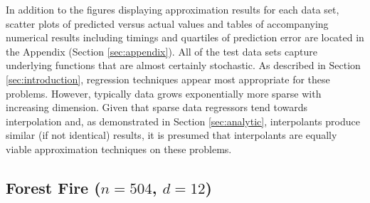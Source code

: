 In addition to the figures displaying approximation results for each
data set, scatter plots of predicted versus actual values
  and tables of accompanying numerical results including
  timings and quartiles of prediction error are located in the
Appendix (Section \ref{sec:appendix}). All of the test data sets
capture underlying functions that are almost certainly stochastic. As
described in Section \ref{sec:introduction}, regression techniques
appear most appropriate for these problems. However, typically data
grows exponentially more sparse with increasing dimension. Given that
sparse data regressors tend towards interpolation and, as demonstrated
in Section \ref{sec:analytic}, interpolants produce similar (if not
identical) results, it is presumed that interpolants are equally
viable approximation techniques on these problems.

\subsection{Forest Fire ($n = 504$, $d = 12$)}

